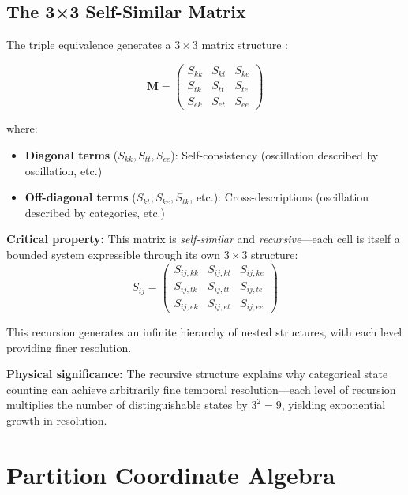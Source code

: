 \documentclass[twocolumn,10pt]{article}
\theoremstyle{remark}
\begin{document}
\subsection{The 3×3 Self-Similar Matrix}

The triple equivalence generates a $3 \times 3$ matrix structure \cite{sachikonye2025epistemology}:

\begin{equation}
    \mathbf{M} = \begin{pmatrix}
        S_{kk} & S_{kt} & S_{ke} \\
        S_{tk} & S_{tt} & S_{te} \\
        S_{ek} & S_{et} & S_{ee}
    \end{pmatrix}
    \label{eq:3x3_matrix}
\end{equation}

where:
\begin{itemize}
    \item \textbf{Diagonal terms} ($S_{kk}, S_{tt}, S_{ee}$): Self-consistency (oscillation described by oscillation, etc.)
    \item \textbf{Off-diagonal terms} ($S_{kt}, S_{ke}, S_{tk}$, etc.): Cross-descriptions (oscillation described by categories, etc.)
\end{itemize}

\textbf{Critical property:} This matrix is \textit{self-similar} and \textit{recursive}—each cell is itself a bounded system expressible through its own $3 \times 3$ structure:
\begin{equation}
    S_{ij} = \begin{pmatrix}
        S_{ij,kk} & S_{ij,kt} & S_{ij,ke} \\
        S_{ij,tk} & S_{ij,tt} & S_{ij,te} \\
        S_{ij,ek} & S_{ij,et} & S_{ij,ee}
    \end{pmatrix}
    \label{eq:recursive_matrix}
\end{equation}

This recursion generates an infinite hierarchy of nested structures, with each level providing finer resolution.

\textbf{Physical significance:} The recursive structure explains why categorical state counting can achieve arbitrarily fine temporal resolution—each level of recursion multiplies the number of distinguishable states by $3^2 = 9$, yielding exponential growth in resolution.

\section{Partition Coordinate Algebra}
\label{sec:partition}
\end{document}
